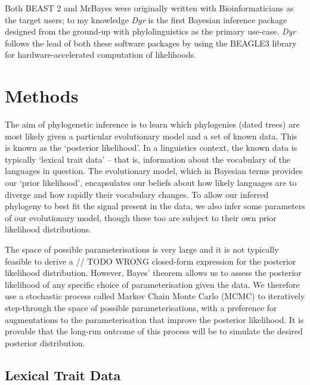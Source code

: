 \documentclass[10pt,journal,compsoc]{IEEEtran}
\begin{document}
Both BEAST 2 and MrBayes were originally written with Bioinformaticians as the target users; to my knowledge \textit{Dyr} is the first Bayesian inference package designed from the ground-up with phylolinguistics as the primary use-case. \textit{Dyr} follows the lead of both these software packages by using the BEAGLE3 library for hardware-accelerated computation of likelihoods.\cite{ayres2019beagle}

\section{Methods}

The aim of phylogenetic inference is to learn which phylogenies (dated trees) are most likely given a particular evolutionary model and a set of known data. This is known as the `posterior likelihood'. In a linguistics context, the known data is typically `lexical trait data' -- that is, information about the vocabulary of the languages in question. The evolutionary model, which in Bayesian terms provides our `prior likelihood', encapsulates our beliefs about how likely languages are to diverge and how rapidly their vocabulary changes. To allow our inferred phylogeny to best fit the signal present in the data, we also infer some parameters of our evolutionary model, though these too are subject to their own prior likelihood distributions.

The space of possible parameterisations is very large and it is not typically feasible to derive a // TODO WRONG closed-form expression for the posterior likelihood distribution. However, Bayes' theorem allows us to assess the posterior likelihood of any specific choice of parameterisation given the data. We therefore use a stochastic process called Markov Chain Monte Carlo (MCMC) to iteratively step-through the space of possible parameterisations, with a preference for augmentations to the parameterisation that improve the posterior likelihood. It is provable that the long-run outcome of this process will be to simulate the desired posterior distribution.

\subsection{Lexical Trait Data}
\end{document}
